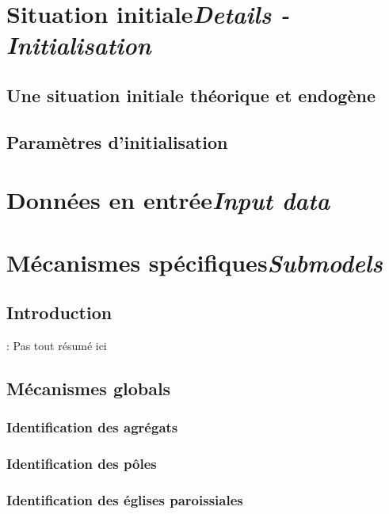 \section[Situation initiale -- \textit{Details - Initialisation}]{Situation initiale\protect\newline \large{\textit{Details - Initialisation}}}

\subsection{Une situation initiale théorique et endogène}
\subsection{Paramètres d'initialisation}

\section[Données en entrée -- \textit{Input data}]{Données en entrée\protect\newline \large{\textit{Input data}}}

\section[Mécanismes spécifiques -- \textit{Submodels}]{Mécanismes spécifiques\protect\newline \large{\textit{Submodels}}}

\subsection{Introduction} : Pas tout résumé ici

\subsection{Mécanismes globals}
	\subsubsection{Identification des agrégats}
	\subsubsection{Identification des pôles}
	\subsubsection{Identification des églises paroissiales}
